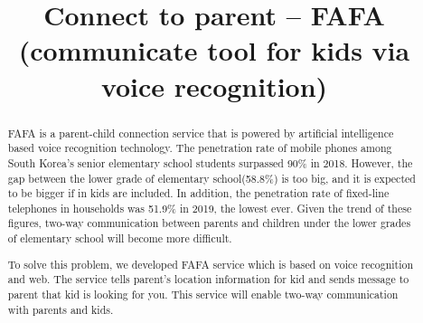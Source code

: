 \documentclass[conference]{IEEEtran}
\begin{document}
\title{Connect to parent – FAFA\\ \LARGE(communicate tool for kids via voice recognition)}

\author{
\and
{}
\and
{}
\and
{}
}

\maketitle

\begin{abstract}
FAFA is a parent-child connection service that is powered by artificial intelligence based voice recognition technology. The penetration rate of mobile phones among South Korea's senior elementary school students surpassed 90\% in 2018. However, the gap between the lower grade of elementary school(58.8\%) is too big, and it is expected to be bigger if in kids are included. In addition, the penetration rate of fixed-line telephones in households was 51.9\% in 2019, the lowest ever. Given the trend of these figures, two-way communication between parents and children under the lower grades of elementary school will become more difficult.

To solve this problem, we developed FAFA service which is based on voice recognition and web. The service tells parent’s location information for kid and sends message to parent that kid is looking for you. This service will enable two-way communication with parents and kids. 

\end{abstract}
\end{document}
